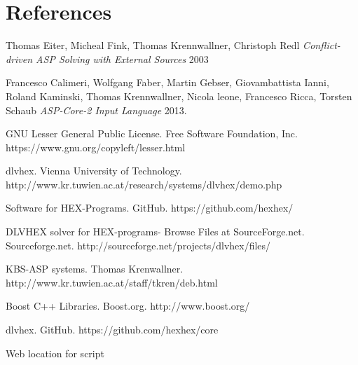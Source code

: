 \documentclass[14pt,a4paper, titlepage]{article}
\begin{document}
\section{References}
\begin{thebibliography}{1}
 Thomas Eiter, Micheal Fink, Thomas Krennwallner, Christoph Redl {\em Conflict-driven ASP Solving with External Sources} 2003   
  
 Francesco Calimeri, Wolfgang Faber, Martin Gebser, Giovambattista Ianni, Roland Kaminski, Thomas Krennwallner, Nicola leone, Francesco Ricca, Torsten Schaub {\em ASP-Core-2 Input Language} 2013.

 GNU Lesser General Public License. Free Software Foundation, Inc. https://www.gnu.org/copyleft/lesser.html 

dlvhex. Vienna University of Technology. http://www.kr.tuwien.ac.at/research/systems/dlvhex/demo.php 

Software for HEX-Programs. GitHub. https://github.com/hexhex/ 

DLVHEX solver for HEX-programs-  Browse Files at SourceForge.net. Sourceforge.net. http://sourceforge.net/projects/dlvhex/files/

KBS-ASP systems. Thomas Krenwallner. http://www.kr.tuwien.ac.at/staff/tkren/deb.html

Boost C++ Libraries. Boost.org. http://www.boost.org/

dlvhex. GitHub. https://github.com/hexhex/core

Web location for script
      
 
 \end{thebibliography} 
\end{document}
